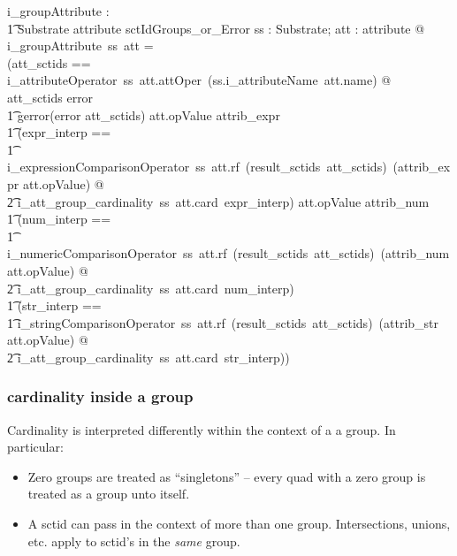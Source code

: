\documentclass{article}
\begin{document}
\begin{axdef}
   i\_groupAttribute : \\
\t1 Substrate  \fun attribute \fun sctIdGroups\_or\_Error 
\where
   \forall ss : Substrate; att : attribute @ \\
   i\_groupAttribute~ss~att = \\
   (\LET att\_sctids == i\_attributeOperator~ss~att.attOper~(ss.i\_attributeName~att.name) @ \\
   \IF att\_sctids \in \ran error \\
\t1 \THEN gerror(error \inv att\_sctids)
\also
   \ELSE \IF att.opValue \in \ran attrib\_expr \THEN \\
\t1 (\LET expr\_interp == \\
\t1 i\_expressionComparisonOperator~ss~att.rf~(result\_sctids~att\_sctids)~(attrib\_expr \inv att.opValue)  @ \\
\t2 i\_att\_group\_cardinality~ss~att.card~expr\_interp)
\also
   \ELSE \IF att.opValue \in \ran attrib\_num  \THEN \\
\t1 (\LET num\_interp == \\
\t1 i\_numericComparisonOperator~ss~att.rf~(result\_sctids~att\_sctids)~(attrib\_num \inv att.opValue)  @ \\
\t2 i\_att\_group\_cardinality~ss~att.card~num\_interp)
\also
   \ELSE  \\
\t1 (\LET str\_interp == \\
\t1 i\_stringComparisonOperator~ss~att.rf~(result\_sctids~att\_sctids)~(attrib\_str \inv att.opValue)  @ \\
\t2 i\_att\_group\_cardinality~ss~att.card~str\_interp))
\end{axdef}

\subsubsection{cardinality inside a group}

Cardinality is interpreted differently within the context of a a group.  In particular:
\begin{itemize}[noitemsep]
\item Zero groups are treated as ``singletons'' -- every quad with a zero group is treated as a group unto itself.
\item A sctid can pass in the context of more than one group.  Intersections, unions, etc. apply to sctid's in the \emph{same} group.
\end{itemize}
\end{document}
